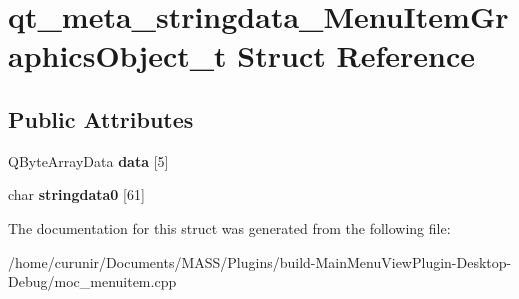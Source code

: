 \hypertarget{structqt__meta__stringdata___menu_item_graphics_object__t}{}\section{qt\+\_\+meta\+\_\+stringdata\+\_\+\+Menu\+Item\+Graphics\+Object\+\_\+t Struct Reference}
\label{structqt__meta__stringdata___menu_item_graphics_object__t}
\subsection*{Public Attributes}
\begin{DoxyCompactItemize}
\item 
Q\+Byte\+Array\+Data {\bfseries data} \mbox{[}5\mbox{]}\hypertarget{structqt__meta__stringdata___menu_item_graphics_object__t_af9745a02d5975d686fd2629c225f37fc}{}\label{structqt__meta__stringdata___menu_item_graphics_object__t_af9745a02d5975d686fd2629c225f37fc}

\item 
char {\bfseries stringdata0} \mbox{[}61\mbox{]}\hypertarget{structqt__meta__stringdata___menu_item_graphics_object__t_a56e432638c023dce510aebff66c320c7}{}\label{structqt__meta__stringdata___menu_item_graphics_object__t_a56e432638c023dce510aebff66c320c7}

\end{DoxyCompactItemize}


The documentation for this struct was generated from the following file\+:\begin{DoxyCompactItemize}
\item 
/home/curunir/\+Documents/\+M\+A\+S\+S/\+Plugins/build-\/\+Main\+Menu\+View\+Plugin-\/\+Desktop-\/\+Debug/moc\+\_\+menuitem.\+cpp\end{DoxyCompactItemize}
